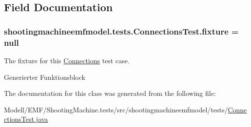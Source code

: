 \subsection{Field Documentation}
\hypertarget{classshootingmachineemfmodel_1_1tests_1_1_connections_test_abc7477fbf60d557d5e27a89c635f7bd7}{
\subsubsection[{fixture}]{ shootingmachineemfmodel.\-tests.\-Connections\-Test.\-fixture = null\hspace{0.3cm}{\ttfamily [protected]}}}\label{classshootingmachineemfmodel_1_1tests_1_1_connections_test_abc7477fbf60d557d5e27a89c635f7bd7}
The fixture for this \hyperlink{interfaceshootingmachineemfmodel_1_1_connections}{Connections} test case.

Generierter Funktionsblock 

The documentation for this class was generated from the following file\-:\begin{DoxyCompactItemize}
\item 
Modell/\-E\-M\-F/\-Shooting\-Machine.\-tests/src/shootingmachineemfmodel/tests/\hyperlink{_connections_test_8java}{Connections\-Test.\-java}\end{DoxyCompactItemize}
